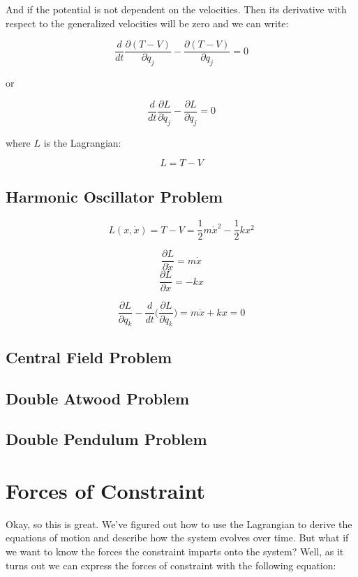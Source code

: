 \documentclass{article}
\begin{document}
And if the potential is not dependent on the velocities.  Then its derivative with respect to the generalized velocities will be zero and we can write:

$$\frac{ d }{ dt } \frac{ \partial ( T - V ) }{ \partial \dot{ q }_j  } - \frac{ \partial ( T - V ) }{ \partial q_j } = 0$$

or

$$\frac{ d }{ dt } \frac{ \partial L }{ \partial \dot{ q }_j  } - \frac{ \partial L }{ \partial q_j } = 0$$

where $L$ is the Lagrangian:

$$L = T - V$$

%
%
%
\subsection{Harmonic Oscillator Problem}

$$L( x, \dot{ x } ) = T - V = \frac{ 1 }{ 2 } m \dot{ x }^2 - \frac{ 1 }{ 2 } k x^2$$

$$\frac{ \partial L }{ \partial \dot{ x } } = m \dot{ x }$$
$$\frac{ \partial L }{ \partial x } = - k x$$

$$\frac{ \partial L }{ \partial q_k } - \frac{ d }{ dt } \Big( \frac{ \partial L }{ \partial \dot{ q }_k } \Big) = m \ddot{ x } + k x = 0$$

%
%
%
\subsection{Central Field Problem}

%
%
%
\subsection{Double Atwood Problem}

%
%
%
\subsection{Double Pendulum Problem}









%
%
\newpage
\section{Forces of Constraint}

Okay, so this is great.  We've figured out how to use the Lagrangian to derive the equations of motion and describe how the system evolves over time.  But what if we want to know the forces the constraint imparts onto the system?  Well, as it turns out we can express the forces of constraint with the following equation:
\end{document}
